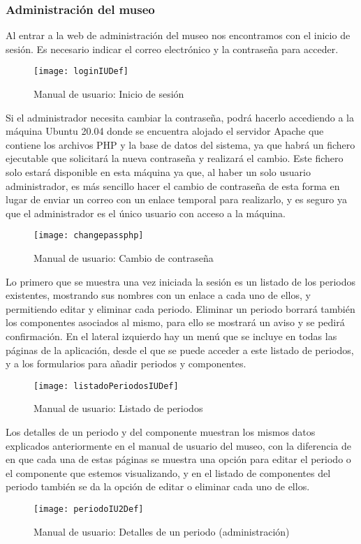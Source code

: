 \subsubsection{Administración del museo}
Al entrar a la web de administración del museo nos encontramos con el inicio de sesión. Es necesario indicar el correo electrónico y la contraseña para acceder.
\begin{figure}[H]
\centering
\texttt{[image: loginIUDef]}
\caption{Manual de usuario: Inicio de sesión}
\end{figure}
Si el administrador necesita cambiar la contraseña, podrá hacerlo accediendo a la máquina Ubuntu 20.04 donde se encuentra alojado el servidor Apache que contiene los archivos PHP y la base de datos del sistema, ya que habrá un fichero ejecutable que solicitará la nueva contraseña y realizará el cambio. Este fichero solo estará disponible en esta máquina ya que, al haber un solo usuario administrador, es más sencillo hacer el cambio de contraseña de esta forma en lugar de enviar un correo con un enlace temporal para realizarlo, y es seguro ya que el administrador es el único usuario con acceso a la máquina.
\begin{figure}[H]
\centering
\texttt{[image: changepassphp]}
\caption{Manual de usuario: Cambio de contraseña}
\end{figure}
Lo primero que se muestra una vez iniciada la sesión es un listado de los periodos existentes, mostrando sus nombres con un enlace a cada uno de ellos, y permitiendo editar y eliminar cada periodo. Eliminar un periodo borrará también los componentes asociados al mismo, para ello se mostrará un aviso y se pedirá confirmación. En el lateral izquierdo hay un menú que se incluye en todas las páginas de la aplicación, desde el que se puede acceder a este listado de periodos, y a los formularios para añadir periodos y componentes.
\begin{figure}[H]
\centering
\texttt{[image: listadoPeriodosIUDef]}
\caption{Manual de usuario: Listado de periodos}
\end{figure}
Los detalles de un periodo y del componente muestran los mismos datos explicados anteriormente en el manual de usuario del museo, con la diferencia de en que cada una de estas páginas se muestra una opción para editar el periodo o el componente que estemos visualizando, y en el listado de componentes del periodo también se da la opción de editar o eliminar cada uno de ellos.
\begin{figure}[H]
\centering
\texttt{[image: periodoIU2Def]}
\caption{Manual de usuario: Detalles de un periodo (administración)}
\end{figure}
